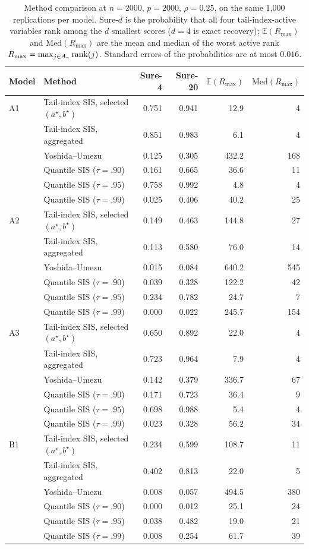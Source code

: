 \begin{table}[t]
\centering
\caption{Method comparison at $n=2000$, $p=2000$, $\rho=0.25$, on the same 1{,}000 replications per model. Sure-$d$ is the probability that all four tail-index-active variables rank among the $d$ smallest scores ($d=4$ is exact recovery); $\mathbb{E}(R_{\max})$ and $\mathrm{Med}(R_{\max})$ are the mean and median of the worst active rank $R_{\max}=\max_{j\in A_\gamma}\mathrm{rank}(j)$. Standard errors of the probabilities are at most $0.016$.}
\label{tab:cmp2000}
\begin{tabular}{llrrrr}
\toprule
Model & Method & Sure-4 & Sure-20 & $\mathbb{E}(R_{\max})$ & $\mathrm{Med}(R_{\max})$\\
\midrule
A1 & Tail-index SIS, selected $(a^\star,b^\star)$ & 0.751 & 0.941 & 12.9 & 4\\
 & Tail-index SIS, aggregated & 0.851 & 0.983 & 6.1 & 4\\
 & Yoshida--Umezu & 0.125 & 0.305 & 432.2 & 168\\
 & Quantile SIS ($\tau=.90$) & 0.161 & 0.665 & 36.6 & 11\\
 & Quantile SIS ($\tau=.95$) & 0.758 & 0.992 & 4.8 & 4\\
 & Quantile SIS ($\tau=.99$) & 0.025 & 0.406 & 40.2 & 25\\
\addlinespace
A2 & Tail-index SIS, selected $(a^\star,b^\star)$ & 0.149 & 0.463 & 144.8 & 27\\
 & Tail-index SIS, aggregated & 0.113 & 0.580 & 76.0 & 14\\
 & Yoshida--Umezu & 0.015 & 0.084 & 640.2 & 545\\
 & Quantile SIS ($\tau=.90$) & 0.039 & 0.328 & 122.2 & 42\\
 & Quantile SIS ($\tau=.95$) & 0.234 & 0.782 & 24.7 & 7\\
 & Quantile SIS ($\tau=.99$) & 0.000 & 0.022 & 245.7 & 154\\
\addlinespace
A3 & Tail-index SIS, selected $(a^\star,b^\star)$ & 0.650 & 0.892 & 22.0 & 4\\
 & Tail-index SIS, aggregated & 0.723 & 0.964 & 7.9 & 4\\
 & Yoshida--Umezu & 0.142 & 0.379 & 336.7 & 67\\
 & Quantile SIS ($\tau=.90$) & 0.171 & 0.723 & 36.4 & 9\\
 & Quantile SIS ($\tau=.95$) & 0.698 & 0.988 & 5.4 & 4\\
 & Quantile SIS ($\tau=.99$) & 0.023 & 0.328 & 56.2 & 34\\
\addlinespace
B1 & Tail-index SIS, selected $(a^\star,b^\star)$ & 0.234 & 0.599 & 108.7 & 11\\
 & Tail-index SIS, aggregated & 0.402 & 0.813 & 22.0 & 5\\
 & Yoshida--Umezu & 0.008 & 0.057 & 494.5 & 380\\
 & Quantile SIS ($\tau=.90$) & 0.000 & 0.012 & 25.1 & 24\\
 & Quantile SIS ($\tau=.95$) & 0.038 & 0.482 & 19.0 & 21\\
 & Quantile SIS ($\tau=.99$) & 0.008 & 0.254 & 61.7 & 39\\
\bottomrule
\end{tabular}
\end{table}
